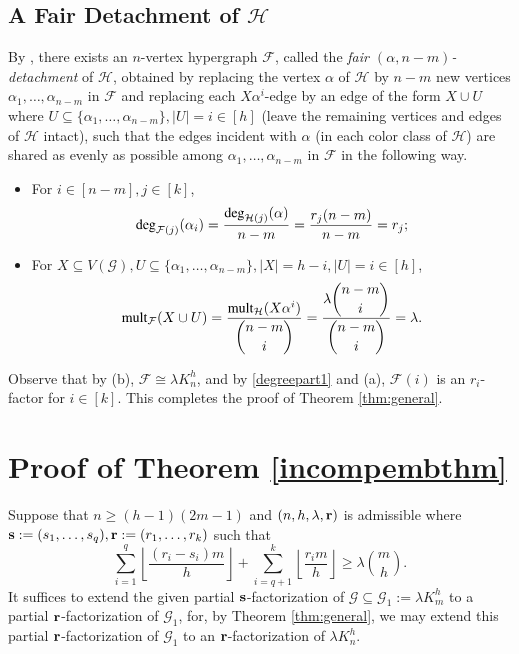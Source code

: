 \documentclass[12pt,oneside]{amsart}
\newcommand\mult{\operatorname{\textup{{\fontfamily{ptm}\selectfont mult}}}}
\newcommand\dg{\operatorname{\textup{{\fontfamily{ptm}\selectfont deg}}}}
\newcommand{\cc}{\mathcal}
\newcommand\rounddown[1]{\left\lfloor#1\right\rfloor}
\begin{document}
\subsection{A Fair Detachment of  \texorpdfstring{$\bm{\cc H}$}{p}} \label{fairetachmsubsec}
By \cite[Theorem 4.1]{MR2942724}, there exists an $n$-vertex hypergraph $\cc F$, called the {\it fair $(\alpha, n-m)$-detachment} of $\cc H$, obtained by replacing the vertex $\alpha$ of $\cc H$ by $n-m$ new vertices  $\alpha_1,\dots,\alpha_{n-m}$ in $\cc F$ and replacing each $X\alpha^i$-edge by an edge of the form $X\cup U$ where $U\subseteq \{\alpha_1,\dots,\alpha_{n-m}\}, |U|=i\in [h]$ (leave the remaining vertices and edges of $\cc H$ intact),   such that the edges incident with $\alpha$ (in each color class of $\cc H$) are shared as evenly as possible among $\alpha_1,\dots,\alpha_{n-m}$ in $\cc F$ in the following way.
\begin{itemize}
    \item [(a)] For  $i\in [n-m],j\in[k]$, 
    \begin{align*} 
        \dg_{\cc F(j)}(\alpha_i)=\dfrac{\dg_{\cc H(j)}(\alpha)}{n-m}=\dfrac{r_j(n-m)}{n-m}=r_j;
    \end{align*}
    \item [(b)] For $X\subseteq V(\cc G), U\subseteq \{\alpha_1,\dots,\alpha_{n-m}\}, |X|=h-i, |U|=i\in [h]$, 
    \begin{align} \label{multcond}
    \mult_{\cc F}(X\cup U)=\dfrac{\mult_{\cc H}(X\alpha^i)}{\dbinom{n-m}{i}}=\dfrac{\lambda\dbinom{n-m}{i}}{\dbinom{n-m}{i}}=\lambda.
    \end{align}
\end{itemize}
Observe that by (b), $\cc F \cong \lambda K_n^h$, and by \eqref{degreepart1} and (a), $\cc F(i)$ is an $r_i$-factor for $i\in [k]$. This completes the proof of Theorem \ref{thm:general}.



\section{Proof of Theorem \ref{incompembthm}}

Suppose that $n \geq (h-1)(2m-1)$ and $(n,h,\lambda, \vb r)$ is admissible where $\vb{s}:=(s_1,\dots,s_q), \vb{r}:=(r_1,\dots,r_k)$ such that $$\sum_{i=1}^q \rounddown{\frac{(r_i-s_i)m}{h}}+\sum_{i=q+1}^k \rounddown{\frac{r_im}{h}} \geq \lambda\binom{m}{h}.$$
 It suffices to extend the given partial $\vb{s}$-factorization of $\mathcal G\subseteq \cc G_1:=\lambda K_m^h$ to a partial $\vb r$-factorization of $\cc G_1$, for,  by Theorem \ref{thm:general}, we may extend this partial $\vb r$-factorization of $\cc G_1$ to an $\vb r$-factorization of $\lambda K_n^h$.
\end{document}
